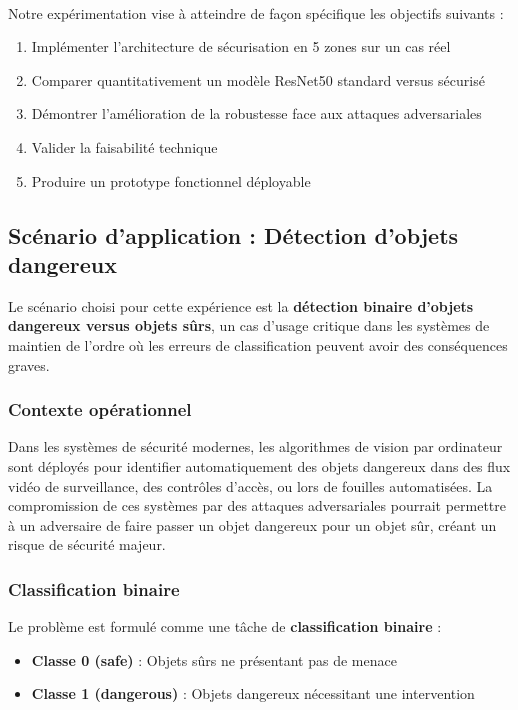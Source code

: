 \paragraph{}

Notre expérimentation vise à atteindre de façon spécifique les objectifs suivants :

\begin{enumerate}
    \item Implémenter l'architecture de sécurisation en 5 zones sur un cas réel
    \item Comparer quantitativement un modèle ResNet50 standard versus sécurisé
    \item Démontrer l'amélioration de la robustesse face aux attaques adversariales
    \item Valider la faisabilité technique
    \item Produire un prototype fonctionnel déployable
\end{enumerate}


\subsection{Scénario d'application : Détection d'objets dangereux}

Le scénario choisi pour cette expérience est la \textbf{détection binaire d'objets dangereux versus objets sûrs}, un cas d'usage critique dans les systèmes de maintien de l'ordre où les erreurs de classification peuvent avoir des conséquences graves.

\subsubsection{Contexte opérationnel}

Dans les systèmes de sécurité modernes, les algorithmes de vision par ordinateur sont déployés pour identifier automatiquement des objets dangereux dans des flux vidéo de surveillance, des contrôles d'accès, ou lors de fouilles automatisées. La compromission de ces systèmes par des attaques adversariales pourrait permettre à un adversaire de faire passer un objet dangereux pour un objet sûr, créant un risque de sécurité majeur.

\subsubsection{Classification binaire}

Le problème est formulé comme une tâche de \textbf{classification binaire} :
\begin{itemize}
    \item \textbf{Classe 0 (safe)} : Objets sûrs ne présentant pas de menace
    \item \textbf{Classe 1 (dangerous)} : Objets dangereux nécessitant une intervention
\end{itemize}

